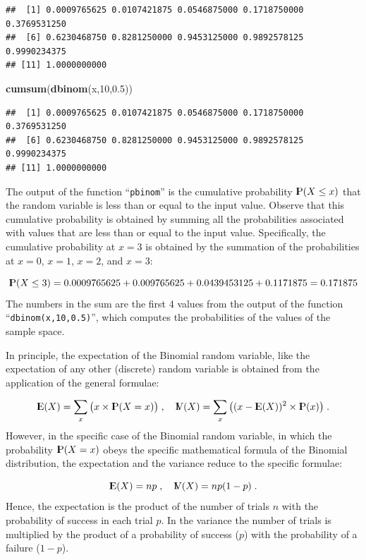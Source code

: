 \documentclass[]{krantz}
\makeatletter
\newenvironment{Shaded}{\begin{snugshade}}{\end{snugshade}}
\newcommand{\DecValTok}[1]{\textcolor[rgb]{0.00,0.00,0.81}{#1}}
\newcommand{\FloatTok}[1]{\textcolor[rgb]{0.00,0.00,0.81}{#1}}
\newcommand{\KeywordTok}[1]{\textcolor[rgb]{0.13,0.29,0.53}{\textbf{#1}}}
\newcommand{\NormalTok}[1]{#1}
\newcommand{\Expec}{{\rm I\kern-.3em E}}
\newcommand{\Prob}{{\rm I\kern-.3em P}}
\newcommand{\Var}{{\rm I\kern-.3em V}}
\newenvironment{kframe}{%
\medskip{}
\setlength{\fboxsep}{.8em}
 \def\at@end@of@kframe{}%
 \ifinner\ifhmode%
  \def\at@end@of@kframe{\end{minipage}}%
  \begin{minipage}{\columnwidth}%
 \fi\fi%
 \def\FrameCommand##1{\hskip\@totalleftmargin \hskip-\fboxsep
 \colorbox{shadecolor}{##1}\hskip-\fboxsep
     \hskip-\linewidth \hskip-\@totalleftmargin \hskip\columnwidth}%
 \MakeFramed {\advance\hsize-\width
   \@totalleftmargin\z@ \linewidth\hsize
   \@setminipage}}%
 {\par\unskip\endMakeFramed%
 \at@end@of@kframe}
\renewenvironment{Shaded}{\begin{kframe}}{\end{kframe}}
\theoremstyle{definition}
\theoremstyle{definition}
\theoremstyle{definition}
\theoremstyle{remark}
\makeatother
\begin{document}
\begin{verbatim}
##  [1] 0.0009765625 0.0107421875 0.0546875000 0.1718750000 0.3769531250
##  [6] 0.6230468750 0.8281250000 0.9453125000 0.9892578125 0.9990234375
## [11] 1.0000000000
\end{verbatim}

\begin{Shaded}
\begin{Highlighting}[]
\KeywordTok{cumsum}\NormalTok{(}\KeywordTok{dbinom}\NormalTok{(x,}\DecValTok{10}\NormalTok{,}\FloatTok{0.5}\NormalTok{))}
\end{Highlighting}
\end{Shaded}

\begin{verbatim}
##  [1] 0.0009765625 0.0107421875 0.0546875000 0.1718750000 0.3769531250
##  [6] 0.6230468750 0.8281250000 0.9453125000 0.9892578125 0.9990234375
## [11] 1.0000000000
\end{verbatim}

The output of the function ``\texttt{pbinom}'' is the cumulative probability
\(\Prob(X \leq x)\) that the random variable is less than or equal to the
input value. Observe that this cumulative probability is obtained by
summing all the probabilities associated with values that are less than
or equal to the input value. Specifically, the cumulative probability at
\(x=3\) is obtained by the summation of the probabilities at \(x=0\), \(x=1\),
\(x=2\), and \(x=3\):

\[\Prob(X \leq 3) = 0.0009765625 + 0.009765625 + 0.0439453125 + 0.1171875 = 0.171875\]
The numbers in the sum are the first 4 values from the output of the
function ``\texttt{dbinom(x,10,0.5)}'', which computes the probabilities of the
values of the sample space.

In principle, the expectation of the Binomial random variable, like the
expectation of any other (discrete) random variable is obtained from the
application of the general formulae:

\[\Expec(X) = \sum_x \big(x \times \Prob(X = x)\big)\;,\quad \Var(X) = \sum_x\big( (x-\Expec(X))^2 \times \Prob(x)\big)\;.\]
However, in the specific case of the Binomial random variable, in which
the probability \(\Prob(X = x)\) obeys the specific mathematical formula
of the Binomial distribution, the expectation and the variance reduce to
the specific formulae:

\[\Expec(X) = n p\;,\quad \Var(X) = n p(1-p)\;.\]
Hence, the expectation is the product of the number of trials \(n\) with
the probability of success in each trial \(p\). In the variance the number
of trials is multiplied by the product of a probability of success (\(p\))
with the probability of a failure (\(1-p\)).
\end{document}
